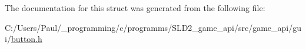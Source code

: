 The documentation for this struct was generated from the following file\+:\begin{DoxyCompactItemize}
\item 
C\+:/\+Users/\+Paul/\+\_\+programming/c/programms/\+S\+L\+D2\+\_\+game\+\_\+api/src/game\+\_\+api/gui/\hyperlink{button_8h}{button.\+h}\end{DoxyCompactItemize}
